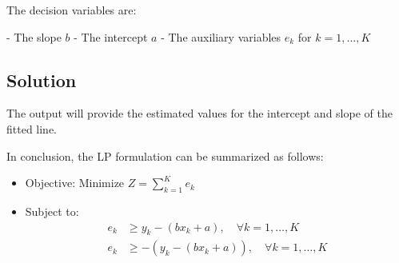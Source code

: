 \documentclass{article}
\begin{document}
The decision variables are:

- The slope \( b \)
- The intercept \( a \)
- The auxiliary variables \( e_k \) for \( k = 1, \ldots, K \)

\subsection*{Solution}

The output will provide the estimated values for the intercept and slope of the fitted line. 

In conclusion, the LP formulation can be summarized as follows:

\begin{itemize}
    \item Objective: Minimize \( Z = \sum_{k=1}^{K} e_k \)
    \item Subject to:
    \begin{align*}
        e_k & \geq y_k - (bx_k + a), \quad \forall k = 1, \ldots, K \\
        e_k & \geq -(y_k - (bx_k + a)), \quad \forall k = 1, \ldots, K
    \end{align*}
\end{itemize}
\end{document}
